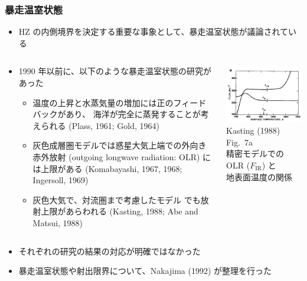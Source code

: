\documentclass[aspectratio=149,9pt,fleqn]{beamer}
\begin{document}
\begin{frame}
	\frametitle{暴走温室状態}
	\begin{itemize}
		\item HZ の内側境界を決定する重要な事象として、暴走温室状態が議論されている
	\end{itemize}
	\begin{columns}[T,onlytextwidth]
		\begin{column}{.65\textwidth}
			\begin{itemize}
				\item 1990 年以前に、以下のような暴走温室状態の研究があった
					\begin{itemize}
						\item 温度の上昇と水蒸気量の増加には正のフィードバックがあり、
							海洋が完全に蒸発することが考えられる (Plass, 1961; Gold, 1964)
						\item 灰色成層圏モデルでは惑星大気上端での外向き赤外放射
							(outgoing longwave radiation: OLR) には上限がある
							(Komabayashi, 1967, 1968; Ingersoll, 1969)
						\item 灰色大気で、対流圏まで考慮したモデル
							でも放射上限があらわれる (Kasting, 1988; Abe and Matsui, 1988)
					\end{itemize}
			\end{itemize}
		\end{column}
		\begin{column}{.3\textwidth}
			\centering\small
			\includegraphics[width=.95\textwidth]{kasting7a.png}\\
			Kasting (1988) Fig.\ 7a\\
			精密モデルでの OLR (\(F_{\mathrm{IR}}\)) と\\
			地表面温度の関係
		\end{column}
	\end{columns}
	\begin{itemize}
		\item それぞれの研究の結果の対応が明確ではなかった
		\item 暴走温室状態や射出限界について、Nakajima \etal (1992) が整理を行った
	\end{itemize}
\end{frame}
\end{document}
